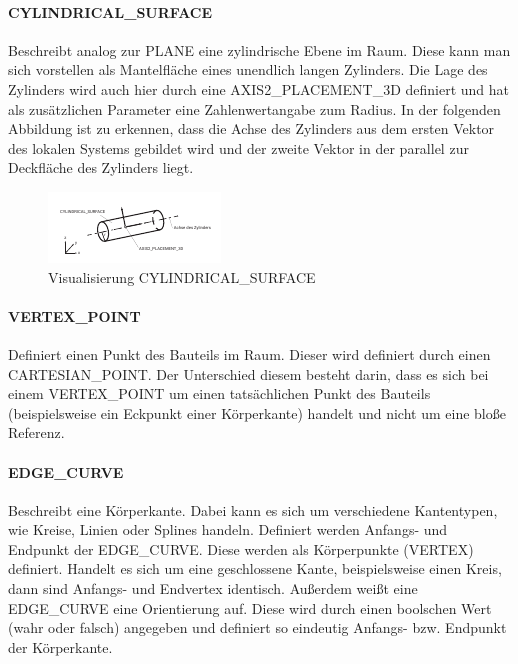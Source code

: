 \paragraph{CYLINDRICAL\_SURFACE}


Beschreibt analog zur PLANE eine zylindrische Ebene im Raum. Diese kann man sich vorstellen als Mantelfläche eines unendlich langen Zylinders. Die Lage des Zylinders wird auch hier durch eine AXIS2\_PLACEMENT\_3D definiert und hat als zusätzlichen Parameter eine Zahlenwertangabe zum Radius. In der folgenden Abbildung ist zu erkennen, dass die Achse des Zylinders aus dem ersten Vektor des lokalen Systems gebildet wird und der zweite Vektor in der parallel zur Deckfläche des Zylinders liegt.

\begin{figure}[h]
	\centering
	
	\includegraphics[width=0.7\linewidth]{img/cylinder_entity.pdf}
	
	\caption{Visualisierung CYLINDRICAL\_SURFACE}
	
\end{figure}

\paragraph{VERTEX\_POINT}

Definiert einen Punkt des Bauteils im Raum. Dieser wird definiert durch einen CARTESIAN\_POINT. Der Unterschied diesem besteht darin, dass es sich bei einem VERTEX\_POINT um einen tatsächlichen Punkt des Bauteils (beispielsweise ein Eckpunkt einer Körperkante) handelt und nicht um eine bloße Referenz.   

\paragraph{EDGE\_CURVE}

Beschreibt eine Körperkante. Dabei kann es sich um verschiedene Kantentypen, wie Kreise, Linien oder Splines  handeln. Definiert werden Anfangs- und Endpunkt der EDGE\_CURVE. Diese werden als Körperpunkte (VERTEX) definiert. Handelt es sich um eine geschlossene Kante, beispielsweise einen Kreis, dann sind Anfangs- und Endvertex identisch. Außerdem weißt eine EDGE\_CURVE eine Orientierung auf. Diese wird durch einen boolschen Wert (wahr oder falsch) angegeben und definiert so eindeutig Anfangs- bzw. Endpunkt der Körperkante.   

